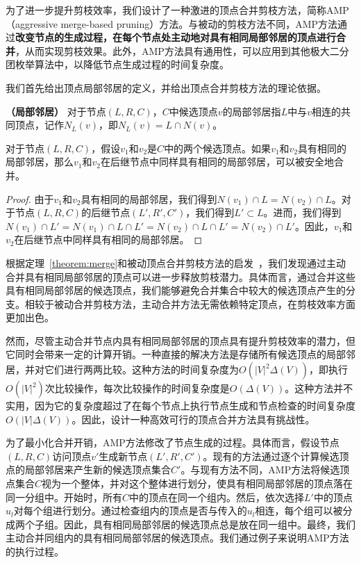 为了进一步提升剪枝效率，我们设计了一种激进的顶点合并剪枝方法，简称AMP （aggressive merge-based pruning）方法。与被动的剪枝方法不同，AMP方法通过\textbf{改变节点的生成过程，在每个节点处主动地对具有相同局部邻居的顶点进行合并}，从而实现剪枝效果。此外，AMP方法具有通用性，可以应用到其他极大二分团枚举算法中，以降低节点生成过程的时间复杂度。

我们首先给出顶点局部邻居的定义，并给出顶点合并剪枝方法的理论依据。

\begin{definition}
  \textbf{（局部邻居）} 对于节点$(L,R,C)$，$C$中候选顶点$v$的局部邻居指$L$中与$v$相连的共同顶点，记作$N_L(v)$，即$N_L(v) = L \cap N(v)$。
\end{definition}

\begin{theorem}
  对于节点$(L,R,C)$，假设$v_1$和$v_2$是$C$中的两个候选顶点。如果$v_1$和$v_2$具有相同的局部邻居，那么$v_1$和$v_2$在后继节点中同样具有相同的局部邻居，可以被安全地合并。
  \label{theorem:merge}
\end{theorem}

\begin{proof}
  由于$v_1$和$v_2$具有相同的局部邻居，我们得到$N(v_1)\cap L = N(v_2)\cap L$。对于节点$(L,R,C)$的后继节点$(L',R',C')$，我们得到$L' \subset L$。进而，我们得到$N(v_1)\cap L' = N(v_1) \cap L \cap L' = N(v_2) \cap L \cap L' = N(v_2)\cap L'$。因此，$v_1$和$v_2$在后继节点中同样具有相同的局部邻居。
\end{proof}


根据定理~\ref{theorem:merge}和被动顶点合并剪枝方法的启发~\cite{iMBEA14}，我们发现通过主动合并具有相同局部邻居的顶点可以进一步释放剪枝潜力。具体而言，通过合并这些具有相同局部邻居的候选顶点，我们能够避免合并集合中较大的候选顶点产生的分支。相较于被动合并剪枝方法，主动合并方法无需依赖特定顶点，在剪枝效率方面更加出色。

然而，尽管主动合并节点内具有相同局部邻居的顶点具有提升剪枝效率的潜力，但它同时会带来一定的计算开销。一种直接的解决方法是存储所有候选顶点的局部邻居，并对它们进行两两比较。这种方法的时间复杂度为$O(|V|^2\Delta(V))$，即执行$O(|V|^2)$次比较操作，每次比较操作的时间复杂度是$O(\Delta(V))$。这种方法并不实用，因为它的复杂度超过了在每个节点上执行节点生成和节点检查的时间复杂度$O(|V|\Delta(V))$。因此，设计一种高效可行的顶点合并方法具有挑战性。

为了最小化合并开销，AMP方法修改了节点生成的过程。具体而言，假设节点$(L,R,C)$访问顶点$v'$生成新节点$(L',R',C')$。现有的方法通过逐个计算候选顶点的局部邻居来产生新的候选顶点集合$C'$。与现有方法不同，AMP方法将候选顶点集合$C$视为一个整体，并对这个整体进行划分，使具有相同局部邻居的顶点落在同一分组中。开始时，所有$C$中的顶点在同一个组内。然后，依次选择$L'$中的顶点$u_l$对每个组进行划分。通过检查组内的顶点是否与传入的$u_l$相连，每个组可以被分成两个子组。因此，具有相同局部邻居的候选顶点总是放在同一组中。最终，我们主动合并同组内的具有相同局部邻居的候选顶点。我们通过例子来说明AMP方法的执行过程。


